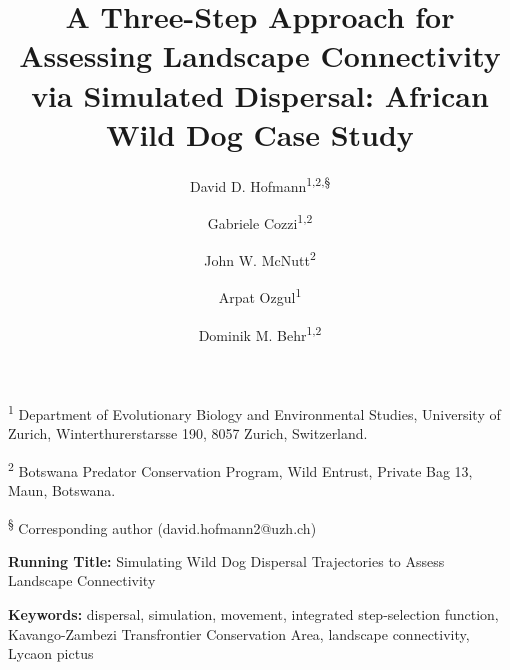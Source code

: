 \documentclass[abstract=on,10pt,a4paper,bibliography=totocnumbered]{article}
\title{A Three-Step Approach for Assessing Landscape Connectivity via Simulated
Dispersal: African Wild Dog Case Study}
\author{
  David D. Hofmann\textsuperscript{1,2,\S} \orcid{0000-0003-3477-4365} \and
  Gabriele Cozzi\textsuperscript{1,2} \orcid{0000-0002-1744-1940} \and
  John W. McNutt\textsuperscript{2} \and
  Arpat Ozgul\textsuperscript{1} \orcid{0000-0001-7477-2642} \and
  Dominik M. Behr\textsuperscript{1,2} \orcid{0000-0001-7378-8538}
}
\begin{document}



\maketitle

\begin{flushleft}

\vspace{0.5cm}

\textsuperscript{1} Department of Evolutionary Biology and Environmental
Studies, University of Zurich, Winterthurerstarsse 190, 8057 Zurich,
Switzerland.

\textsuperscript{2} Botswana Predator Conservation Program, Wild Entrust,
Private Bag 13, Maun, Botswana.

\textsuperscript{\S} Corresponding author (david.hofmann2@uzh.ch)

\vspace{4cm}

\textbf{Running Title:} Simulating Wild Dog Dispersal Trajectories to Assess
Landscape Connectivity

\vspace{0.5cm}

\textbf{Keywords:} dispersal, simulation, movement, integrated step-selection
function, Kavango-Zambezi Transfrontier Conservation Area, landscape
connectivity, Lycaon pictus

\end{flushleft}
\end{document}
